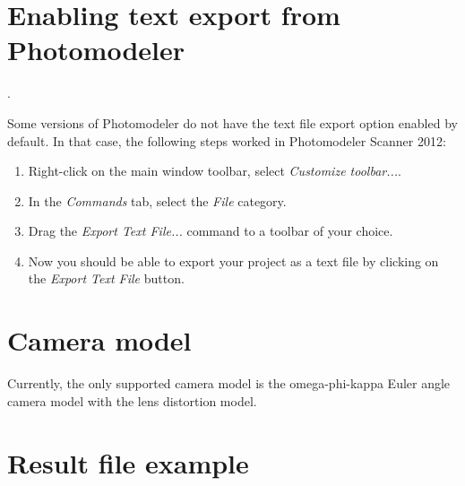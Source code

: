 \documentclass{article}
\begin{document}
\newpage


\appendix

\newpage

\section{Enabling text export from Photomodeler}
\label{sec:enableTextExport}.

Some versions of Photomodeler do not have the text file export option
enabled by default. In that case, the following steps worked in
Photomodeler Scanner 2012:
\begin{enumerate}
\item Right-click on the main window toolbar, select \emph{Customize toolbar...}.
\item In the \emph{Commands} tab, select the \emph{File} category.
\item Drag the \emph{Export Text File...} command to a toolbar of
  your choice.
\item Now you should be able to export your project as a text file by
  clicking on the \emph{Export Text File} button.
\end{enumerate}


\section{Camera model}

Currently, the only supported camera model is the omega-phi-kappa
Euler angle camera model \citep[Ch.~2.1.2.3]{McGlone2004:Manual} with
the \citet{Brown1971:Close-range} lens distortion model.

\section{Result file example}
\label{sec:resultFile}

\scriptsize

\end{document}
